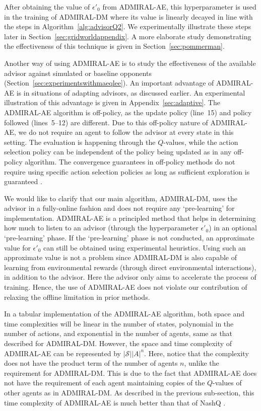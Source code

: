 \documentclass[jair, twoside,11pt,theapa]{article}
\begin{document}
After obtaining the value of $\epsilon'_0$ from ADMIRAL-AE, this hyperparameter is used in the training of ADMIRAL-DM where its value is linearly decayed in line with the steps in Algorithm~\ref{alg:advisorQ2}. We experimentally illustrate these steps later in Section~\ref{sec:gridworldappendix}. A more elaborate study demonstrating the effectiveness of this technique is given in Section~\ref{sec:pommerman}.  



Another way of using ADMIRAL-AE is to study the effectiveness of the available advisor against simulated or baseline opponents (Section~\ref{sec:experimentswithmaeqlee}). An important advantage of ADMIRAL-AE is in situations of adapting advisors, as discussed earlier. An experimental illustration of this advantage is given in Appendix~\ref{sec:adaptive}. The ADMIRAL-AE algorithm is off-policy, as the update policy (line~15) and policy followed (lines~5--12) are different. Due to this off-policy nature of ADMIRAL-AE, we do not require an agent to follow the advisor at every state in this setting. The evaluation is happening through the $Q$-values, while the action selection policy can be independent of the policy being updated as in any off-policy algorithm. The convergence guarantees in off-policy methods do not require using specific action selection policies as long as sufficient exploration is guaranteed \citep{jaakkola1994convergence, sutton1998introduction}. 

We would like to clarify that our main algorithm, ADMIRAL-DM, uses the advisor in a fully-online fashion and does not require any `pre-learning' for implementation. ADMIRAL-AE is a principled method that helps in determining how much to listen to an advisor (through the hyperparameter $\epsilon'_0$) in an optional `pre-learning' phase. If the `pre-learning' phase is not conducted, an approximate value for $\epsilon'_0$ can still be obtained using experimental heuristics. Using such an approximate value is not a problem since ADMIRAL-DM is also capable of learning from environmental rewards (through direct environmental interactions), in addition to the advisor. Here the advisor only aims to accelerate the process of training. Hence, the use of ADMIRAL-AE does not violate our contribution of relaxing the offline limitation in prior methods. 

In a tabular implementation of the ADMIRAL-AE algorithm, both space and time complexities will be linear in the number of states, polynomial in the number of actions, and exponential in the number of agents, same as that described for ADMIRAL-DM. However, the space and time complexity of ADMIRAL-AE can be represented by $|\mathcal{S}||A|^n$. Here, notice that the complexity does not have the product term of the number of agents $n$, unlike the requirement for ADMIRAL-DM. This is due to the fact that ADMIRAL-AE does not have the requirement of each agent maintaining copies of the $Q$-values of other agents as  in ADMIRAL-DM. As described in the previous sub-section, this time complexity of ADMIRAL-AE is much better than that of NashQ \citep{hu2003nash}. 
\end{document}
